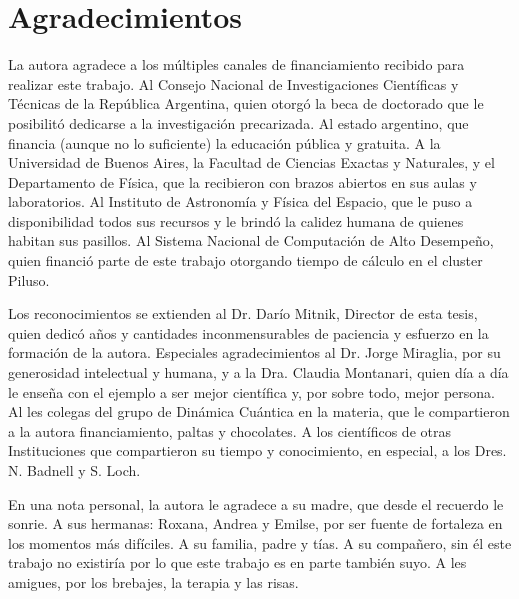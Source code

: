 \chapter*{Agradecimientos}%
%

La autora agradece a los múltiples canales de financiamiento recibido 
para realizar este trabajo. Al Consejo Nacional de 
Investigaciones Científicas y Técnicas de la República Argentina, quien 
otorgó la beca de doctorado que le posibilitó dedicarse a la 
investigación precarizada. Al estado argentino, que financia (aunque no 
lo suficiente) la educación pública y gratuita. A la Universidad de 
Buenos Aires, la Facultad de Ciencias Exactas y Naturales, y el 
Departamento de Física, que la recibieron con brazos abiertos en sus 
aulas y laboratorios. Al Instituto de Astronomía y Física del Espacio, 
que le puso a disponibilidad todos sus recursos y le brindó la calidez 
humana de quienes habitan sus pasillos. 
Al Sistema Nacional de Computación de Alto Desempeño, quien 
financió parte de este trabajo otorgando tiempo de cálculo en el cluster 
Piluso. 

Los reconocimientos se extienden al Dr. Darío Mitnik, Director de esta 
tesis, quien dedicó años y cantidades inconmensurables de paciencia y 
esfuerzo en la formación de la autora. Especiales agradecimientos al 
Dr. Jorge Miraglia, por su generosidad intelectual y humana, y a la Dra. 
Claudia Montanari, quien día a día le enseña con el ejemplo a ser mejor 
científica y, por sobre todo, mejor persona. Al les colegas del grupo de 
Dinámica Cuántica en la materia, que le compartieron a la autora 
financiamiento, paltas y chocolates. A los científicos de otras 
Instituciones que compartieron su tiempo y conocimiento, en especial, a 
los Dres. N. Badnell y S. Loch.

En una nota personal, la autora le agradece a su madre, que desde el 
recuerdo le sonrie. A sus hermanas: Roxana, Andrea y Emilse, por ser 
fuente de fortaleza en los momentos más difíciles. A su familia, padre y 
tías. A su compañero, sin él este trabajo no existiría por lo que este 
trabajo es en parte también suyo. A les amigues, por los brebajes, la 
terapia y las risas.

